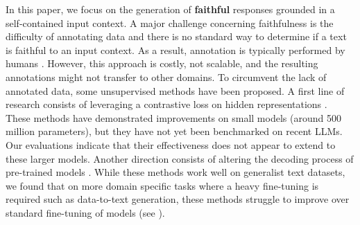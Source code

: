 In this paper, we focus on the generation of \textbf{faithful} responses grounded in a self-contained input context. A major challenge concerning faithfulness is the difficulty of annotating data and there is no standard way to determine if a text is faithful to an input context. As a result, annotation is typically performed by humans \citep{goyal2021annotating,kryscinski-etal-2020-evaluating}. However, this approach is costly, not scalable, and the resulting annotations might not transfer to other domains. To circumvent the lack of annotated data, some unsupervised methods have been proposed. A first line of research consists of leveraging a contrastive loss on hidden representations \citep{zhao-etal-2020-reducing,kryscinski-etal-2019-neural}.  These methods have demonstrated improvements on small models (around 500 million parameters), but they have not yet been benchmarked on recent LLMs. Our evaluations indicate that their effectiveness does not appear to extend to these larger models.
Another direction consists of altering the decoding process of pre-trained models \citep{cad, pmi}. While these methods work well on generalist text datasets, we found that on more domain specific tasks where a heavy fine-tuning is required such as data-to-text generation, these methods struggle to improve over standard fine-tuning of models (see ).
 

